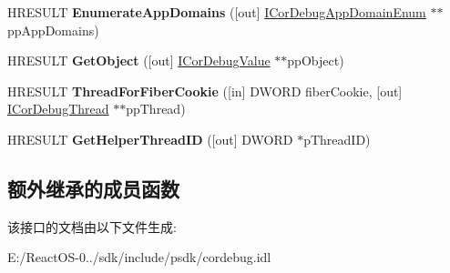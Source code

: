 \begin{DoxyCompactItemize}
H\+R\+E\+S\+U\+LT {\bfseries Enumerate\+App\+Domains} (\mbox{[}out\mbox{]} \hyperlink{interface_i_cor_debug_app_domain_enum}{I\+Cor\+Debug\+App\+Domain\+Enum} $\ast$$\ast$pp\+App\+Domains)
\item 
\mbox{\label{interface_i_cor_debug_process_ac182bf2dc3626bdc115c0ce6d11fa338}} 
H\+R\+E\+S\+U\+LT {\bfseries Get\+Object} (\mbox{[}out\mbox{]} \hyperlink{interface_i_cor_debug_value}{I\+Cor\+Debug\+Value} $\ast$$\ast$pp\+Object)
\item 
\mbox{\label{interface_i_cor_debug_process_ab9ba3024ce072029c43b31a16c19f2e5}} 
H\+R\+E\+S\+U\+LT {\bfseries Thread\+For\+Fiber\+Cookie} (\mbox{[}in\mbox{]} D\+W\+O\+RD fiber\+Cookie, \mbox{[}out\mbox{]} \hyperlink{interface_i_cor_debug_thread}{I\+Cor\+Debug\+Thread} $\ast$$\ast$pp\+Thread)
\item 
\mbox{\label{interface_i_cor_debug_process_a66ea4cca39d188ea03ed65beb0415d59}} 
H\+R\+E\+S\+U\+LT {\bfseries Get\+Helper\+Thread\+ID} (\mbox{[}out\mbox{]} D\+W\+O\+RD $\ast$p\+Thread\+ID)
\end{DoxyCompactItemize}
\subsection*{额外继承的成员函数}


该接口的文档由以下文件生成\+:\begin{DoxyCompactItemize}
\item 
E\+:/\+React\+O\+S-\/0../sdk/include/psdk/cordebug.\+idl\end{DoxyCompactItemize}

